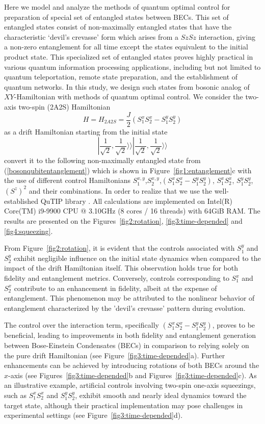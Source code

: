 \documentclass[
aps,%
12pt,%
final,%
notitlepage,%
oneside,%
onecolumn,%
nobibnotes,%
nofootinbib,%
superscriptaddress,%
noshowpacs,%
centertags]%
{revtex4}
\begin{document}
Here we model and analyze the methods of quantum optimal control for preparation of special set of entangled states between BECs. This set of entangled states consist of non-maximally entangled states that have the characteristic ‘devil’s crevasse’ form which arises from a $SzSz$ interaction, giving a non-zero entanglement for all time except the states equivalent to the initial product state. This specialized set of entangled states proves highly practical in various quantum information processing applications, including but not limited to quantum teleportation, remote state preparation, and the establishment of quantum networks. In this study, we design such states from bosonic analog of $XY$-Hamiltonian with methods of quantum optimal control. We consider the two-axis two-spin (2A2S) Hamiltonian $$H = H_{2A2S} = \frac{J}{2} (S_1^x S_2^x - S_1^y S_2^y)$$ as a drift Hamiltonian  starting from the initial state $$| \frac{1}{\sqrt{2}}, \frac{1}{\sqrt{2}} \rangle \rangle | \frac{1}{\sqrt{2}}, \frac{1}{\sqrt{2}} \rangle \rangle$$ convert it to the following non-maximally entangled state from (\ref{bosonqubitentanglement}) which is shown in Figure~\ref{fig1:entanglement}c with the use of different control Hamiltonians $S_1^{x,y}$,$S_2^{x,y}$,$(S_1^x S_2^x - S_1^y S_2^y)$, $S_1^x S_2^x$, $S_1^y S_2^y$, $(S^z)^2$ and their combinations.
In order to realize that we use the well-established QuTIP library \cite{qutip}. All calculations are implemented on Intel(R) Core(TM) i9-9900 CPU @ 3.10GHz (8 cores / 16 threads) with 64GiB RAM. The results are presented on the Figures~\ref{fig2:rotation}, \ref{fig3:time-depended} and \ref{fig4:squeezing}.

From Figure~\ref{fig2:rotation}, it is evident that the controls associated with $S_1^y$ and $S_2^y$ exhibit negligible influence on the initial state dynamics when compared to the impact of the drift Hamiltonian itself. This observation holds true for both fidelity and entanglement metrics. Conversely, controls corresponding to $S_1^x$ and $S_2^x$ contribute to an enhancement in fidelity, albeit at the expense of entanglement. This phenomenon may be attributed to the nonlinear behavior of entanglement characterized by the 'devil’s crevasse' pattern during evolution.


The control over the interaction term, specifically $(S_1^x S_2^x - S_1^y S_2^y)$, proves to be beneficial, leading to improvements in both fidelity and entanglement generation between Bose-Einstein Condensates (BECs) in comparison to relying solely on the pure drift Hamiltonian (see Figure~\ref{fig3:time-depended}a). Further enhancements can be achieved by introducing rotations of both BECs around the $x$-axis (see Figures~\ref{fig3:time-depended}b and Figures~\ref{fig3:time-depended}c). As an illustrative example, artificial controls involving two-spin one-axis squeezings, such as $S_1^x S_2^x$ and $S_1^y S_2^y$, exhibit smooth and nearly ideal dynamics toward the target state, although their practical implementation may pose challenges in experimental settings (see Figure~\ref{fig3:time-depended}d).
\end{document}
